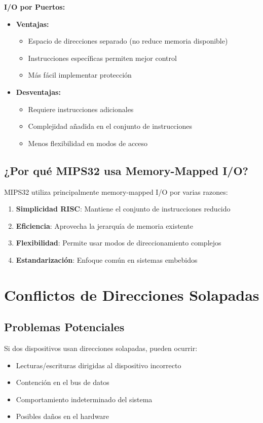 \documentclass[12pt,a4paper]{article}
\begin{document}
\textbf{I/O por Puertos:}
\begin{itemize}
    \item \textbf{Ventajas:}
    \begin{itemize}
        \item Espacio de direcciones separado (no reduce memoria disponible)
        \item Instrucciones específicas permiten mejor control
        \item Más fácil implementar protección
    \end{itemize}
    \item \textbf{Desventajas:}
    \begin{itemize}
        \item Requiere instrucciones adicionales
        \item Complejidad añadida en el conjunto de instrucciones
        \item Menos flexibilidad en modos de acceso
    \end{itemize}
\end{itemize}

\subsection{¿Por qué MIPS32 usa Memory-Mapped I/O?}
MIPS32 utiliza principalmente memory-mapped I/O por varias razones:
\begin{enumerate}
    \item \textbf{Simplicidad RISC}: Mantiene el conjunto de instrucciones reducido
    \item \textbf{Eficiencia}: Aprovecha la jerarquía de memoria existente
    \item \textbf{Flexibilidad}: Permite usar modos de direccionamiento complejos
    \item \textbf{Estandarización}: Enfoque común en sistemas embebidos
\end{enumerate}

\section{Conflictos de Direcciones Solapadas}

\subsection{Problemas Potenciales}
Si dos dispositivos usan direcciones solapadas, pueden ocurrir:
\begin{itemize}
    \item Lecturas/escrituras dirigidas al dispositivo incorrecto
    \item Contención en el bus de datos
    \item Comportamiento indeterminado del sistema
    \item Posibles daños en el hardware
\end{itemize}
\end{document}
